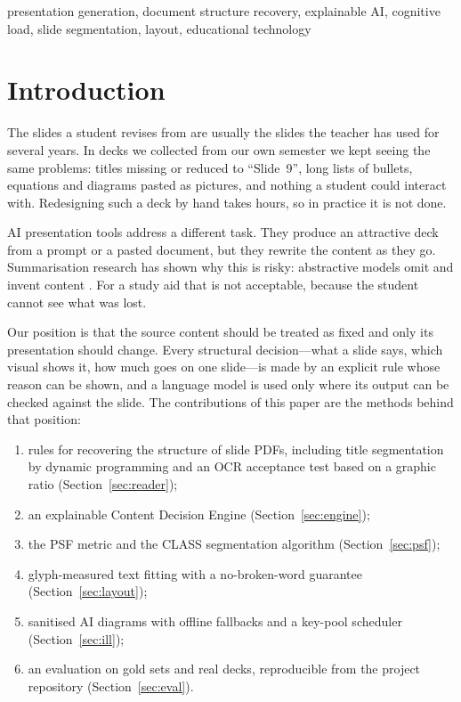 \documentclass[conference]{IEEEtran}
\begin{document}
\begin{IEEEkeywords}
presentation generation, document structure recovery, explainable AI, cognitive load, slide segmentation, layout,
educational technology
\end{IEEEkeywords}

\section{Introduction}
The slides a student revises from are usually the slides the teacher has used for several years. In decks we collected
from our own semester we kept seeing the same problems: titles missing or reduced to ``Slide~9'', long lists of bullets,
equations and diagrams pasted as pictures, and nothing a student could interact with. Redesigning such a deck by hand
takes hours, so in practice it is not done.

AI presentation tools \cite{gamma,copilotppt,geminislides,canva} address a different task. They produce an attractive deck
from a prompt or a pasted document, but they rewrite the content as they go. Summarisation research has shown why this is
risky: abstractive models omit and invent content \cite{maynez2020,ji2023}. For a study aid that is not acceptable,
because the student cannot see what was lost.

Our position is that the source content should be treated as fixed and only its presentation should change. Every
structural decision---what a slide says, which visual shows it, how much goes on one slide---is made by an explicit rule
whose reason can be shown, and a language model is used only where its output can be checked against the slide. The
contributions of this paper are the methods behind that position:
\begin{enumerate}
\item rules for recovering the structure of slide PDFs, including title segmentation by dynamic programming and an OCR
acceptance test based on a graphic ratio (Section~\ref{sec:reader});
\item an explainable Content Decision Engine (Section~\ref{sec:engine});
\item the PSF metric and the CLASS segmentation algorithm (Section~\ref{sec:psf});
\item glyph-measured text fitting with a no-broken-word guarantee (Section~\ref{sec:layout});
\item sanitised AI diagrams with offline fallbacks and a key-pool scheduler (Section~\ref{sec:ill});
\item an evaluation on gold sets and real decks, reproducible from the project repository (Section~\ref{sec:eval}).
\end{enumerate}
\end{document}

